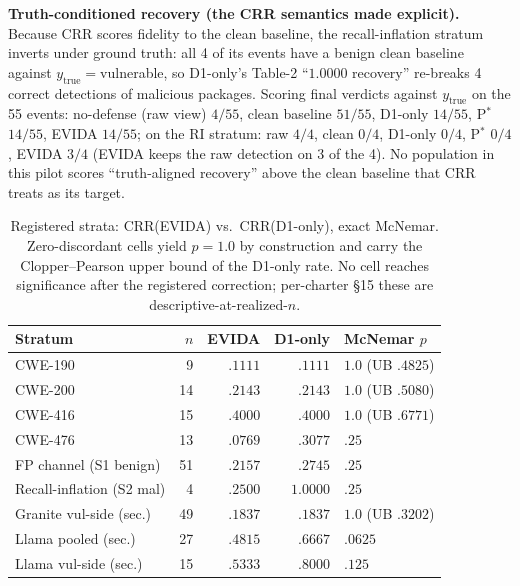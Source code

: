 \documentclass[sigconf,nonacm]{acmart}
\begin{document}
\textbf{Truth-conditioned recovery (the CRR semantics made explicit).}
Because CRR scores fidelity to the clean baseline, the recall-inflation
stratum inverts under ground truth: all 4 of its events have a benign
clean baseline against $y_{\mathrm{true}}{=}$vulnerable, so D1-only's
Table-2 ``$1.0000$ recovery'' re-breaks 4 correct detections of malicious
packages. Scoring final verdicts against $y_{\mathrm{true}}$ on the 55
events: no-defense (raw view) $4/55$, clean baseline $51/55$,
D1-only $14/55$, P$^{*}$ $14/55$, EVIDA $14/55$; on the RI stratum:
raw $4/4$, clean $0/4$, D1-only $0/4$, P$^{*}$ $0/4$, EVIDA $3/4$
(EVIDA keeps the raw detection on 3 of the 4). No population in this
pilot scores ``truth-aligned recovery'' above the clean baseline that
CRR treats as its target.

\begin{table}[t]
\centering\small
\caption{Registered strata: CRR(EVIDA) vs.\ CRR(D1-only), exact McNemar.
Zero-discordant cells yield $p{=}1.0$ by construction and carry the
Clopper--Pearson upper bound of the D1-only rate. No cell reaches
significance after the registered correction; per-charter \S15 these are
descriptive-at-realized-$n$.}
\label{tab:strata}
\begin{tabular}{lrrrl}
\toprule
Stratum & $n$ & EVIDA & D1-only & McNemar $p$ \\
\midrule
CWE-190 & 9 & $.1111$ & $.1111$ & $1.0$ (UB $.4825$) \\
CWE-200 & 14 & $.2143$ & $.2143$ & $1.0$ (UB $.5080$) \\
CWE-416 & 15 & $.4000$ & $.4000$ & $1.0$ (UB $.6771$) \\
CWE-476 & 13 & $.0769$ & $.3077$ & $.25$ \\
FP channel (S1 benign) & 51 & $.2157$ & $.2745$ & $.25$ \\
Recall-inflation (S2 mal) & 4 & $.2500$ & $1.0000$ & $.25$ \\
Granite vul-side (sec.) & 49 & $.1837$ & $.1837$ & $1.0$ (UB $.3202$) \\
Llama pooled (sec.) & 27 & $.4815$ & $.6667$ & $.0625$ \\
Llama vul-side (sec.) & 15 & $.5333$ & $.8000$ & $.125$ \\
\bottomrule
\end{tabular}
\end{table}
\end{document}
